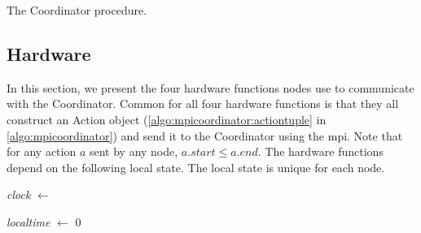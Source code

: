 \begin{algorithm}[H]
{{{{                    
                }

            }
        }
    }
    \caption{The Coordinator procedure.}
    \label{algo:mpicoordinator}
\end{algorithm}

\subsection{Hardware}\label{sec:hwfuncspseudo}
In this section, we present the four hardware functions nodes use to communicate with the Coordinator. Common
for all four hardware functions is that they all construct an Action object
(\autoref{algo:mpicoordinator:actiontuple} in \autoref{algo:mpicoordinator}) and send it to the Coordinator
using the \gls{mpi}. Note that for any action $a$ sent by any node, $a.\mathit{start} \leq a.\mathit{end}$.
The hardware functions depend on the following local state. The local state is unique for each node.
\smallbreak

\textit{clock} $\leftarrow$ \KwNow

\textit{localtime} $\leftarrow$ 0

